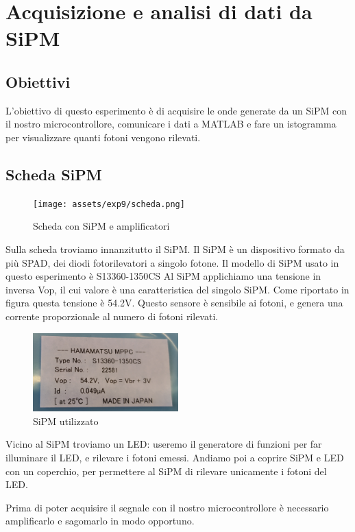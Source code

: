\chapter{Acquisizione e analisi di dati da SiPM}

\section*{Obiettivi}
L'obiettivo di questo esperimento è di acquisire le onde generate da un SiPM con il nostro microcontrollore, comunicare i dati a MATLAB e fare un istogramma per visualizzare quanti fotoni vengono rilevati.

\section*{Scheda SiPM}

\begin{figure}[H]
\centering
\texttt{[image: assets/exp9/scheda.png]}
\caption{Scheda con SiPM e amplificatori}
\end{figure}

Sulla scheda troviamo innanzitutto il SiPM. Il SiPM è un dispositivo formato da più SPAD, dei diodi fotorilevatori a singolo fotone. Il modello di SiPM usato in questo esperimento è S13360-1350CS
Al SiPM applichiamo una tensione in inversa Vop, il cui valore è una caratteristica del singolo SiPM. Come riportato in figura questa tensione è 54.2V.
Questo sensore è sensibile ai fotoni, e genera una corrente proporzionale al numero di fotoni rilevati.

\begin{figure}[H]
\centering
\includegraphics[width=0.5\textwidth]{assets/exp9/SiPM.png}
\caption{SiPM utilizzato}
\end{figure}

Vicino al SiPM troviamo un LED: useremo il generatore di funzioni per far illuminare il LED, e rilevare i fotoni emessi.
Andiamo poi a coprire SiPM e LED con un coperchio, per permettere al SiPM di rilevare unicamente i fotoni del LED.

Prima di poter acquisire il segnale con il nostro microcontrollore è necessario amplificarlo e sagomarlo in modo opportuno.

